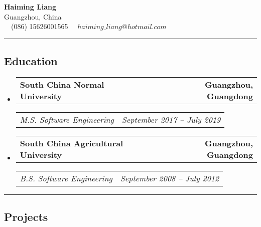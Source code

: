 \documentclass[11pt,letterpaper]{article}
\makeatletter
\newcommand{\headerrow}[2]
{\begin{tabular*}{\linewidth}{l@{\extracolsep{\fill}}r}
#1 &
#2 \\
\end{tabular*}}
\makeatother
\begin{document}
\begin{center}
	{\LARGE \textbf{Haiming Liang}}\\
	Guangzhou, China
	\vspace{0.05cm}
	\\
	\raisebox{-0.2\height} {\Large \faPhoneSquare} \ \  (086) 15626001565 \hfill\raisebox{-0.2\height}{\Large \faEnvelopeSquare} \ \ $haiming\_liang@hotmail.com$
\end{center}

\hrule
\vspace{-1em}



\subsection*{\Large Education}

\begin{itemize}[leftmargin=1em]
	\parskip=0.1em
		
	\item
	      \headerrow
	      {\textbf{South China Normal University}}
	      {\textbf{Guangzhou, Guangdong}}
	      \headerrow
	      {\emph{M.S. Software Engineering}}
	      {\emph{September 2017 -- July 2019}}
    \item
            \headerrow
	      {\textbf{South China Agricultural University}}
	      {\textbf{Guangzhou, Guangdong}}
	      \headerrow
	      {\emph{B.S. Software Engineering}}
	      {\emph{September 2008 -- July 2012}}
	      	      
\end{itemize}
\hrule
\vspace{-1em}



\subsection*{\Large Projects}
\end{document}
